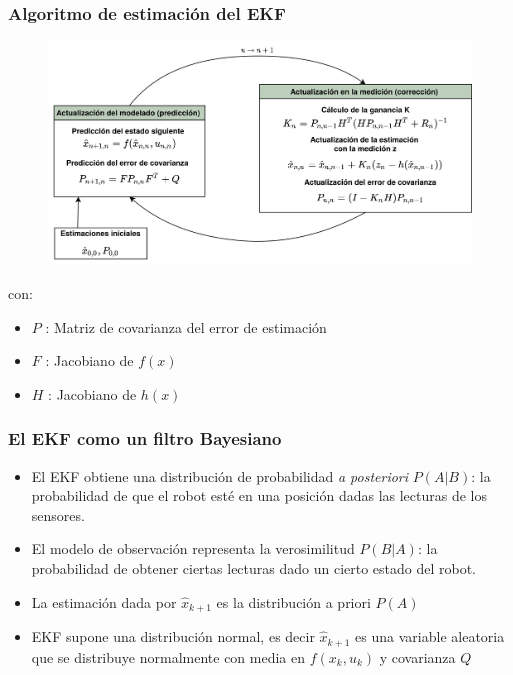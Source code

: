 \begin{frame}\frametitle{Algoritmo de estimación del EKF}
  \begin{figure}
    \centering
    \includegraphics[height=0.6\textheight]{Figures/EKF2.png}
  \end{figure}
  con:
  \begin{itemize}
  \item $P$ : Matriz de covarianza del error de estimación
  \item $F$ : Jacobiano de $f(x)$
  \item $H$ : Jacobiano de $h(x)$
  \end{itemize}
\end{frame}

\begin{frame}\frametitle{El EKF como un filtro Bayesiano}
  \begin{itemize}
  \item El EKF obtiene una distribución de probabilidad \textit{a posteriori} $P(A|B)$: la probabilidad de que el robot esté en una posición dadas las lecturas de los sensores.
  \item El modelo de observación representa la verosimilitud $P(B|A)$: la probabilidad de obtener ciertas lecturas dado un cierto estado del robot.
  \item La estimación dada por $\hat{x}_{k+1}$ es la distribución a priori $P(A)$
  \item EKF supone una distribución normal, es decir $\hat{x}_{k+1}$ es una variable aleatoria que se distribuye normalmente con media en $f(x_k, u_k)$ y covarianza $Q$
  \end{itemize}
\end{frame}

